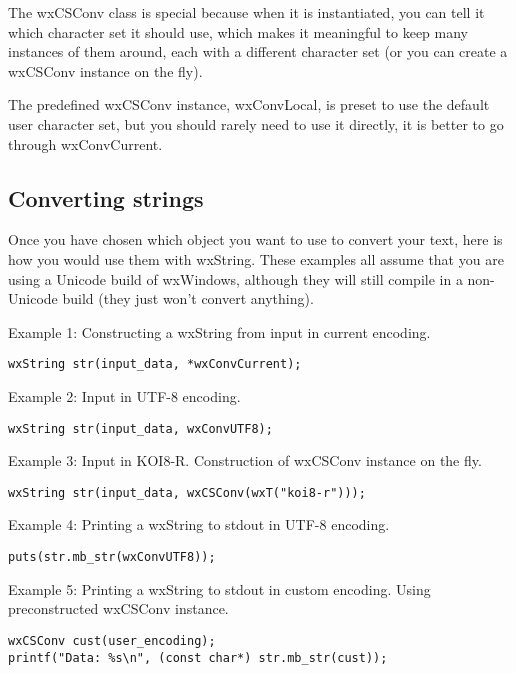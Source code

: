 The wxCSConv class is special because when it is instantiated, you can tell it
which character set it should use, which makes it meaningful to keep many
instances of them around, each with a different character set (or you can
create a wxCSConv instance on the fly).

The predefined wxCSConv instance, wxConvLocal, is preset to use the
default user character set, but you should rarely need to use it directly,
it is better to go through wxConvCurrent.

\subsection{Converting strings}

Once you have chosen which object you want to use to convert your text,
here is how you would use them with wxString. These examples all assume
that you are using a Unicode build of wxWindows, although they will still
compile in a non-Unicode build (they just won't convert anything).

Example 1: Constructing a wxString from input in current encoding.

\begin{verbatim}
wxString str(input_data, *wxConvCurrent);
\end{verbatim}

Example 2: Input in UTF-8 encoding.

\begin{verbatim}
wxString str(input_data, wxConvUTF8);
\end{verbatim}

Example 3: Input in KOI8-R. Construction of wxCSConv instance on the fly.

\begin{verbatim}
wxString str(input_data, wxCSConv(wxT("koi8-r")));
\end{verbatim}

Example 4: Printing a wxString to stdout in UTF-8 encoding.

\begin{verbatim}
puts(str.mb_str(wxConvUTF8));
\end{verbatim}

Example 5: Printing a wxString to stdout in custom encoding.
Using preconstructed wxCSConv instance.

\begin{verbatim}
wxCSConv cust(user_encoding);
printf("Data: %s\n", (const char*) str.mb_str(cust));
\end{verbatim}

